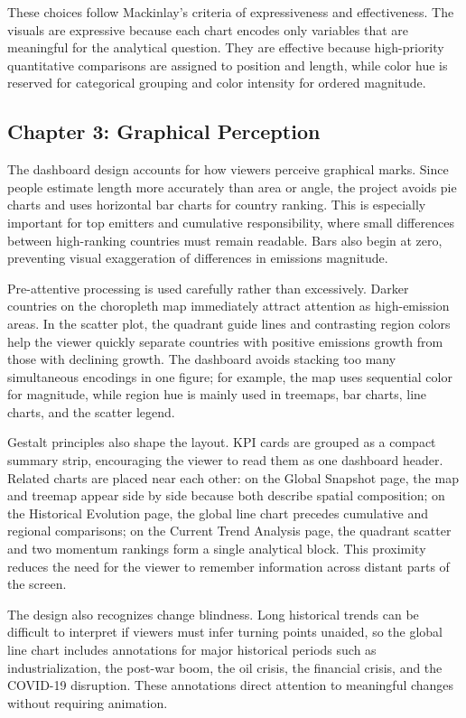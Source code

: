 \documentclass[a4paper,12pt]{article}
\begin{document}
These choices follow Mackinlay's criteria of expressiveness and effectiveness. The
visuals are expressive because each chart encodes only variables that are meaningful for
the analytical question. They are effective because high-priority quantitative comparisons
are assigned to position and length, while color hue is reserved for categorical grouping
and color intensity for ordered magnitude.

\subsection{Chapter 3: Graphical Perception}

The dashboard design accounts for how viewers perceive graphical marks. Since people
estimate length more accurately than area or angle, the project avoids pie charts and
uses horizontal bar charts for country ranking. This is especially important for top
emitters and cumulative responsibility, where small differences between high-ranking
countries must remain readable. Bars also begin at zero, preventing visual exaggeration
of differences in emissions magnitude.

Pre-attentive processing is used carefully rather than excessively. Darker countries on
the choropleth map immediately attract attention as high-emission areas. In the scatter
plot, the quadrant guide lines and contrasting region colors help the viewer quickly
separate countries with positive emissions growth from those with declining growth. The
dashboard avoids stacking too many simultaneous encodings in one figure; for example,
the map uses sequential color for magnitude, while region hue is mainly used in treemaps,
bar charts, line charts, and the scatter legend.

Gestalt principles also shape the layout. KPI cards are grouped as a compact summary
strip, encouraging the viewer to read them as one dashboard header. Related charts are
placed near each other: on the Global Snapshot page, the map and treemap appear side by
side because both describe spatial composition; on the Historical Evolution page, the
global line chart precedes cumulative and regional comparisons; on the Current Trend
Analysis page, the quadrant scatter and two momentum rankings form a single analytical
block. This proximity reduces the need for the viewer to remember information across
distant parts of the screen.

The design also recognizes change blindness. Long historical trends can be difficult to
interpret if viewers must infer turning points unaided, so the global line chart includes
annotations for major historical periods such as industrialization, the post-war boom,
the oil crisis, the financial crisis, and the COVID-19 disruption. These annotations
direct attention to meaningful changes without requiring animation.
\end{document}
